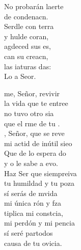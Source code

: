 \documentclass[12pt]{article}
\begin{document}
\begin{multicols*}{2}
\begin{cancion}
	No probarán laerte \\
	de condenacn.\\
	Serdle con terra \\
	y hulde coran,\\
	agdeced sus es, \\
	can su creacn,\\
	las iaturas das:\\
	Lo a Seor.\\
\end{cancion}%

\begin{cancion}[de][Olivo]%
	me, Señor, revivir \\
	la vida que te entree\\
	 no tuvo otro sia \\
	que el rme de tu .\\
	, Señor, que se reve \\
	mi actid de inútil sieo\\
	Que de lo espera do \\
	y o le sabe a evo.  \\
	Haz Ser que siempreiva \\
	tu humildad y tu poza\\
	sí serás de mvida \\
	mi única rón y fza\\
	tiplica mi constcia,\\
	mi perdón y mi pencia\\
	sí seré partodos \\
	causa de tu ovicia.\\
\end{cancion}%


\end{multicols*}
\end{document}
